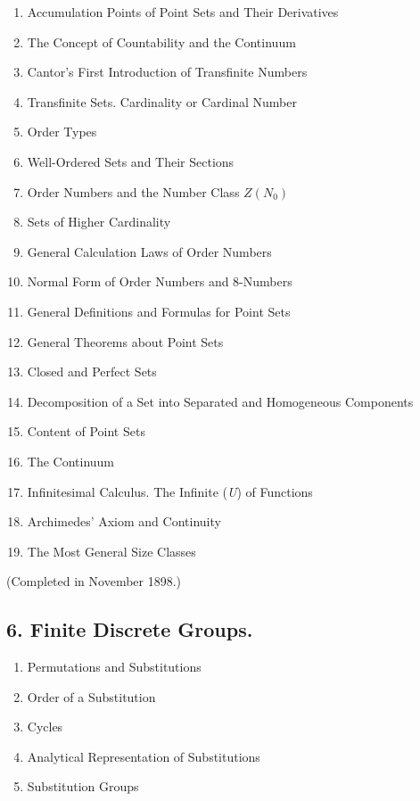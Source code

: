 \begin{enumerate}[itemsep=0pt]
    \item Accumulation Points of Point Sets and Their Derivatives
    \item The Concept of Countability and the Continuum
    \item Cantor's First Introduction of Transfinite Numbers
    \item Transfinite Sets. Cardinality or Cardinal Number
    \item Order Types
    \item Well-Ordered Sets and Their Sections
    \item Order Numbers and the Number Class $Z(N_{0})$
    \item Sets of Higher Cardinality
    \item General Calculation Laws of Order Numbers
    \item Normal Form of Order Numbers and 8-Numbers
    \item General Definitions and Formulas for Point Sets
    \item General Theorems about Point Sets
    \item Closed and Perfect Sets
    \item Decomposition of a Set into Separated and Homogeneous Components
    \item Content of Point Sets
    \item The Continuum
    \item Infinitesimal Calculus. The Infinite (\textit{U}) of Functions
    \item Archimedes' Axiom and Continuity
    \item The Most General Size Classes
\end{enumerate}

\vspace{-0.1cm}
{\normalfont(Completed in November 1898.)}

\subsection*{\small6. Finite Discrete Groups. }

\begin{enumerate}[itemsep=0pt]
    \item Permutations and Substitutions
    \item Order of a Substitution
    \item Cycles
    \item Analytical Representation of Substitutions
    \item Substitution Groups
\end{enumerate}

